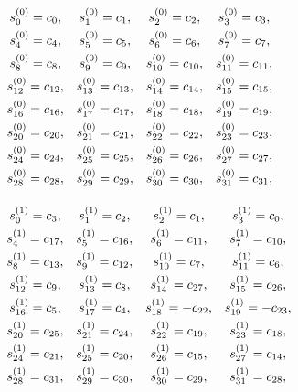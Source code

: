 \documentclass{jtacs}
\numberwithin{equation}{section}
\begin{document}
\begin{center}
\begin{adjustbox}{width=0.54\textwidth, margin=0 0 0 10}
$
\begin{array}{cccc}
\renewcommand*{\arraystretch}{1.5}
\begin{matrix}
s_{0}^{(0)}=c_{0}, & s_{1}^{(0)}=c_{1}, & s_{2}^{(0)}=c_{2}, & s_{3}^{(0)}=c_{3}, \\
s_{4}^{(0)}=c_{4}, & s_{5}^{(0)}=c_{5}, & s_{6}^{(0)}=c_{6}, & s_{7}^{(0)}=c_{7}, \\
s_{8}^{(0)}=c_{8}, & s_{9}^{(0)}=c_{9}, & s_{10}^{(0)}=c_{10}, & s_{11}^{(0)}=c_{11}, \\
s_{12}^{(0)}=c_{12}, & s_{13}^{(0)}=c_{13}, & s_{14}^{(0)}=c_{14}, & s_{15}^{(0)}=c_{15}, \\
s_{16}^{(0)}=c_{16}, & s_{17}^{(0)}=c_{17}, & s_{18}^{(0)}=c_{18}, & s_{19}^{(0)}=c_{19}, \\
s_{20}^{(0)}=c_{20}, & s_{21}^{(0)}=c_{21}, & s_{22}^{(0)}=c_{22}, & s_{23}^{(0)}=c_{23}, \\
s_{24}^{(0)}=c_{24}, & s_{25}^{(0)}=c_{25}, & s_{26}^{(0)}=c_{26}, & s_{27}^{(0)}=c_{27}, \\
s_{28}^{(0)}=c_{28}, & s_{29}^{(0)}=c_{29}, & s_{30}^{(0)}=c_{30}, & s_{31}^{(0)}=c_{31}, \\
\end{matrix}
\end{array}
$
\end{adjustbox}
\end{center}

\begin{center}
\begin{adjustbox}{width=0.57\textwidth, margin=0 0 0 0}
$
\begin{array}{cccc}
\renewcommand*{\arraystretch}{1.5}
\begin{matrix}
s_{0}^{(1)}=c_{3}, & s_{1}^{(1)}=c_{2}, & s_{2}^{(1)}=c_{1}, & s_{3}^{(1)}=c_{0}, \\
s_{4}^{(1)}=c_{17}, & s_{5}^{(1)}=c_{16}, & s_{6}^{(1)}=c_{11}, & s_{7}^{(1)}=c_{10}, \\
s_{8}^{(1)}=c_{13}, & s_{9}^{(1)}=c_{12}, & s_{10}^{(1)}=c_{7}, & s_{11}^{(1)}=c_{6}, \\
s_{12}^{(1)}=c_{9}, & s_{13}^{(1)}=c_{8}, & s_{14}^{(1)}=c_{27}, & s_{15}^{(1)}=c_{26}, \\
s_{16}^{(1)}=c_{5}, & s_{17}^{(1)}=c_{4}, & s_{18}^{(1)}=-c_{22}, & s_{19}^{(1)}=-c_{23}, \\
s_{20}^{(1)}=c_{25}, & s_{21}^{(1)}=c_{24}, & s_{22}^{(1)}=c_{19}, & s_{23}^{(1)}=c_{18}, \\
s_{24}^{(1)}=c_{21}, & s_{25}^{(1)}=c_{20}, & s_{26}^{(1)}=c_{15}, & s_{27}^{(1)}=c_{14}, \\
s_{28}^{(1)}=c_{31}, & s_{29}^{(1)}=c_{30}, & s_{30}^{(1)}=c_{29}, & s_{31}^{(1)}=c_{28}, \\
\end{matrix}
\end{array}
$
\end{adjustbox}
\end{center}
\end{document}
